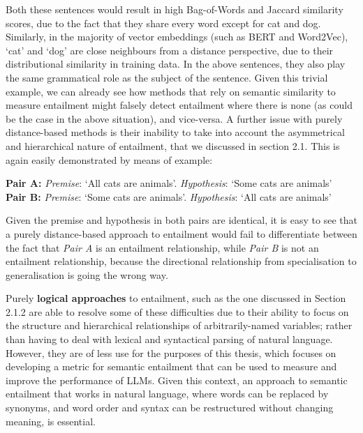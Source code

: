 \documentclass[12pt,twoside]{report}
\begin{document}
Both these sentences would result in high Bag-of-Words and Jaccard similarity scores, due to the fact that they share every word except for cat and dog. Similarly, in the majority of vector embeddings (such as BERT and Word2Vec), `cat' and `dog' are close neighbours from a distance perspective, due to their distributional similarity in training data. In the above sentences, they also play the same grammatical role as the subject of the sentence. Given this trivial example, we can already see how methods that rely on semantic similarity to measure entailment might falsely detect entailment where there is none (as could be the case in the above situation), and vice-versa. A further issue with purely distance-based methods is their inability to take into account the asymmetrical and hierarchical nature of entailment, that we discussed in section 2.1. This is again easily demonstrated by means of example:
\begin{flushleft}
    \textbf{Pair A:} \textit{Premise}: `All cats are animals'. \textit{Hypothesis}: `Some cats are animals' \\
    \textbf{Pair B:} \textit{Premise}: `Some cats are animals'. \textit{Hypothesis}: `All cats are animals'
\end{flushleft}

Given the premise and hypothesis in both pairs are identical, it is easy to see that a purely distance-based approach to entailment would fail to differentiate between the fact that \textit{Pair A} is an entailment relationship, while \textit{Pair B} is not an entailment relationship, because the directional relationship from specialisation to generalisation is going the wrong way. \newline \par

Purely \textbf{logical approaches} to entailment, such as the one discussed in Section 2.1.2 are able to resolve some of these difficulties due to their ability to focus on the structure and hierarchical relationships of arbitrarily-named variables; rather than having to deal with lexical and syntactical parsing of natural language. However, they are of less use for the purposes of this thesis, which focuses on developing a metric for semantic entailment that can be used to measure and improve the performance of LLMs. Given this context, an approach to semantic entailment that works in natural language, where words can be replaced by synonyms, and word order and syntax can be restructured without changing meaning, is essential. \newline \par
\end{document}
